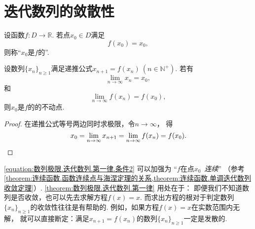 \section{迭代数列的敛散性}
\begin{definition}\label{definition:迭代数列.不动点}
设函数\(f\colon D\to\mathbb{R}\).
若点\(x_0 \in D\)满足\[
	f(x_0) = x_0,
\]
则称“\(x_0\)是\(f\)的”.
\end{definition}
\begin{proposition}\label{theorem:数列极限.迭代数列.第一律}
设数列\(\{x_n\}_{n\geq1}\)满足递推公式\(x_{n+1} = f(x_n)\ (n\in\mathbb{N}^+)\).
若有\[%
	\lim_{n\to\infty} x_n = x_0,
\]和\begin{equation}\label{equation:数列极限.迭代数列.第一律.条件2}
	\lim_{n\to\infty} f(x_n) = f(x_0),
\end{equation}
则\(x_0\)是\(f\)的的不动点.
\begin{proof}
在递推公式等号两边同时求极限，令\(n\to\infty\)，
得\[
	x_0 = \lim_{n\to\infty} x_{n+1} = \lim_{n\to\infty} f(x_n) = f(x_0).
	\qedhere
\]
\end{proof}
\end{proposition}
\begin{remark}
\cref{equation:数列极限.迭代数列.第一律.条件2} 可以加强为
“\(f\)在点\(x_0\)~\emph{连续}”
（参考\cref{theorem:连续函数.函数连续点与海涅定理的关系,theorem:连续函数.单调迭代数列收敛定理}）.
\cref{theorem:数列极限.迭代数列.第一律} 用处在于：
即便我们不知道数列是否收敛，也可以先去求解方程\(f(x) = x\).
而求出方程的根对于判定数列\(\{x_n\}_{n\geq1}\)的收敛性往往是有帮助的.
例如，如果方程\(f(x) = x\)在实数范围内无解，
就可以直接断定：满足\(x_{n+1} = f(x_n)\)的数列\(\{x_n\}_{n\geq1}\)一定是发散的.
\end{remark}
